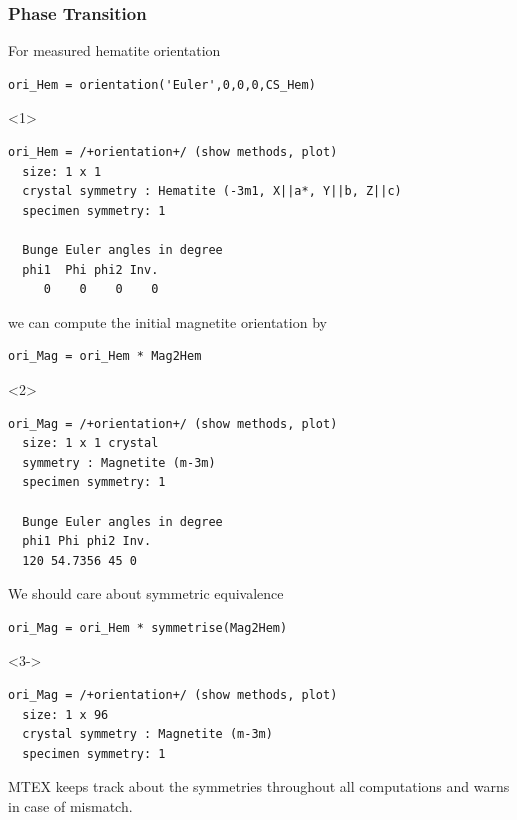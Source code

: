 \documentclass[compress]{beamer}
\begin{document}
\begin{frame}[fragile]
  \frametitle{Phase Transition}

  \begin{overlayarea}{\textwidth}{8cm}
  For measured hematite orientation
  \begin{lstlisting}[style=input]
ori_Hem = orientation('Euler',0,0,0,CS_Hem)
  \end{lstlisting}
  \begin{onlyenv}<1>
    \vspace{-0.3cm}
    \begin{lstlisting}[style=output]
ori_Hem = /+orientation+/ (show methods, plot)
  size: 1 x 1
  crystal symmetry : Hematite (-3m1, X||a*, Y||b, Z||c)
  specimen symmetry: 1

  Bunge Euler angles in degree
  phi1  Phi phi2 Inv.
     0    0    0    0
    \end{lstlisting}
  \end{onlyenv}
  we can compute the initial magnetite orientation by
  \begin{lstlisting}[style=input]
ori_Mag = ori_Hem * Mag2Hem
  \end{lstlisting}

\pause

  \begin{onlyenv}<2>
    \vspace{-0.3cm}
    \begin{lstlisting}[style=output]
ori_Mag = /+orientation+/ (show methods, plot)
  size: 1 x 1 crystal
  symmetry : Magnetite (m-3m)
  specimen symmetry: 1

  Bunge Euler angles in degree
  phi1 Phi phi2 Inv.
  120 54.7356 45 0
    \end{lstlisting}
  \end{onlyenv}

  \pause
  \medskip

  We should care about symmetric equivalence
  \begin{lstlisting}[style=input]
ori_Mag = ori_Hem * symmetrise(Mag2Hem)
  \end{lstlisting}
  \begin{onlyenv}<3->
    \vspace{-0.3cm}
    \begin{lstlisting}[style=output]
ori_Mag = /+orientation+/ (show methods, plot)
  size: 1 x 96
  crystal symmetry : Magnetite (m-3m)
  specimen symmetry: 1
    \end{lstlisting}
  \end{onlyenv}

\pause

\alert{MTEX keeps track about the symmetries throughout all computations and
  warns in case of mismatch.}
\end{overlayarea}
\end{frame}
\end{document}

